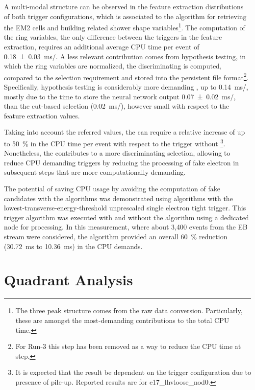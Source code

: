 A multi-modal structure can be observed in the feature extraction distributions
of both trigger configurations, which is associated to the algorithm
for retrieving the EM2 cells and building related shower shape
variables\footnote{The three peak structure comes from the raw data conversion.
	Particularly, these are amongst the most-demanding contributions to
	the \fastcalo total CPU time.}. The computation of the ring variables, the only difference between the
triggers in the \fastcalo feature extraction, requires an additional average CPU time per
event of \SI{0.18 \pm 0.03}{\ms/}. 
A less relevant contribution
comes from hypothesis testing, in which the ring variables are normalized, the
discriminating is computed, compared to the selection requirement and stored into the persistent file format\footnote{For Run-3 this step has been removed as a way to reduce the CPU time at \fastcalo step.}. 
Specifically, \rnn{} hypothesis testing is considerably more demanding
, up to \SI{0.14}{\ms/}, mostly due to the time 
to store the neural network output \SI{0.07 \pm 0.02}{\ms/}, 
than the cut-based selection
(\SI{0.02}{\ms/}), however small with respect to the feature
extraction values. 


Taking into account the referred values, the \rnn{} can require a
relative increase of up to \SI{50}{\%} in the \fastcalo{} CPU time per event
with respect to the trigger without \rnn{}\footnote{It is expected that the result be
	dependent on the trigger configuration due to presence of pile-up. Reported
	results are for e17\_lhvloose\_nod0.}. Nonetheless, the \rnn{} contributes to
a more discriminating selection, allowing to reduce CPU demanding triggers
by reducing the processing of fake electron in subsequent steps that are more computationally demanding.


The potential of saving CPU usage by
avoiding the computation of fake candidates with the \rnn algorithms was demonstrated using algorithms with the lowest-transverse-energy-threshold unprescaled single electron tight trigger. This trigger algorithm was executed with
and without the \rnn{} algorithm using a dedicated node for processing.
In this measurement, where about 3,400 events from the EB stream were considered, the \rnn{} algorithm provided an overall
\SI{60}{\%} reduction (\SI{30.72}{\milli\second} to \SI{10.36}{\milli\second})
in the CPU demands.


\section{Quadrant Analysis}\label{ssec:quadrant}


